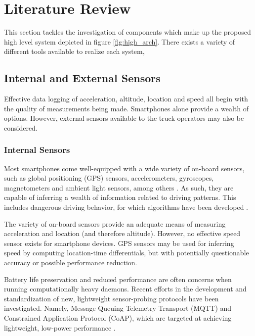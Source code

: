 \section{Literature Review}
This section tackles the investigation of components which make up the proposed high level system depicted in figure \ref{fig:high_arch}.
There exists a variety of different tools available to realize each system, 

\subsection{Internal and External Sensors}
Effective data logging of acceleration, altitude, location and speed all begin with the quality of measurements being made.
Smartphones alone provide a wealth of options.
However, external sensors available to the truck operators may also be considered.

\subsubsection{Internal Sensors}
Most smartphones come well-equipped with a wide variety of on-board sensors, such as global positioning (GPS) sensors, accelerometers, gyroscopes, magnetometers and ambient light sensors, among others \cite{majumder2019smartphone}.
As such, they are capable of inferring a wealth of information related to driving patterns.
This includes dangerous driving behavior, for which algorithms have been developed \cite{li2016dangerous}.

The variety of on-board sensors provide an adequate means of measuring acceleration and location (and therefore altitude). However, no effective speed sensor exists for smartphone devices.
GPS sensors may be used for inferring speed by computing location-time differentials, but with potentially questionable accuracy or possible performance reduction.

Battery life preservation and reduced performance are often concerns when running computationally heavy daemons.
Recent efforts in the development and standardization of new, lightweight sensor-probing protocols have been investigated.
Namely, Message Queuing Telemetry Transport (MQTT) and Constrained Application Protocol (CoAP), which are targeted at achieving lightweight, low-power performance \cite{de2013comparison}.

